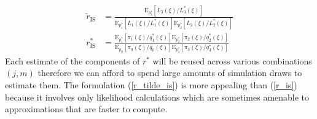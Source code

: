 \documentclass{article}
\begin{document}
\begin{align}
\label{r_tilde_is}
\tilde{r}_{\mathrm{IS}}&=\frac{\mathrm{E}_{p_3^*}[L_{3}(\xi)/L^*_3(\xi)]}{\mathrm{E}_{p_1^*}[L_{1}(\xi)/L^*_1(\xi)]\mathrm{E}_{p_2^*}[L_{2}(\xi)/L^*_2(\xi)]}\\\label{r_star_is}
r^*_{\mathrm{IS}}&=\frac{\mathrm{E}_{p_1^*}[\pi_1(\xi)/q_1^*(\xi)]\mathrm{E}_{p_2^*}[\pi_2(\xi)/q_2^*(\xi)]}{\mathrm{E}_{p_0}[\pi_0(\xi)/q_{0}(\xi)]\mathrm{E}_{p_3^*}[\pi_3(\xi)/q_3^*(\xi)]}
\end{align}Each estimate of the components of $r^*$ will be reused across various combinations $(j,m)$ therefore we can afford to spend large amounts of simulation draws to estimate them. The formulation (\ref{r_tilde_is}) is more appealing than (\ref{r_is}) because it involves only likelihood calculations which are sometimes amenable to approximations that are faster to compute.

\end{document}
